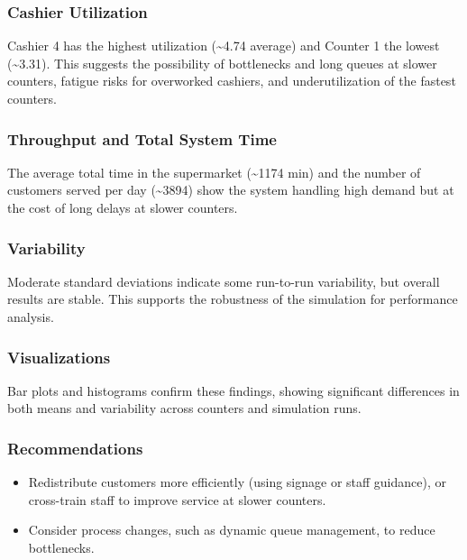 \documentclass[
]{article}
\providecommand{\tightlist}{%
  \setlength{\itemsep}{0pt}\setlength{\parskip}{0pt}}
\begin{document}
\subsubsection{Cashier Utilization}\label{cashier-utilization}

Cashier 4 has the highest utilization (\textasciitilde4.74 average) and
Counter 1 the lowest (\textasciitilde3.31). This suggests the
possibility of bottlenecks and long queues at slower counters, fatigue
risks for overworked cashiers, and underutilization of the fastest
counters.

\subsubsection{Throughput and Total System
Time}\label{throughput-and-total-system-time}

The average total time in the supermarket (\textasciitilde1174 min) and
the number of customers served per day (\textasciitilde3894) show the
system handling high demand but at the cost of long delays at slower
counters.

\subsubsection{Variability}\label{variability}

Moderate standard deviations indicate some run-to-run variability, but
overall results are stable. This supports the robustness of the
simulation for performance analysis.

\subsubsection{Visualizations}\label{visualizations-1}

Bar plots and histograms confirm these findings, showing significant
differences in both means and variability across counters and simulation
runs.

\subsubsection{Recommendations}\label{recommendations}

\begin{itemize}
\tightlist
\item
  Redistribute customers more efficiently (using signage or staff
  guidance), or cross-train staff to improve service at slower counters.
\item
  Consider process changes, such as dynamic queue management, to reduce
  bottlenecks.
\end{itemize}
\end{document}
